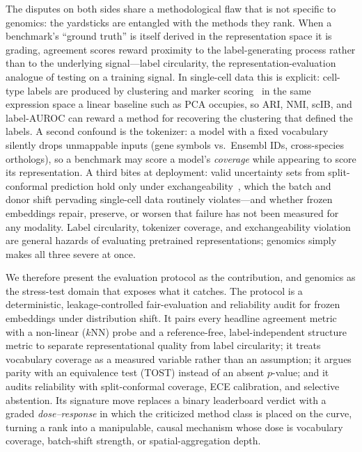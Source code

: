 \documentclass[11pt]{article}
\begin{document}
The disputes on both sides share a methodological flaw that is not specific to genomics: the yardsticks are entangled with the methods they rank. When a benchmark's ``ground truth'' is itself derived in the representation space it is grading, agreement scores reward proximity to the label-generating process rather than to the underlying signal---label circularity, the representation-evaluation analogue of testing on a training signal. In single-cell data this is explicit: cell-type labels are produced by clustering and marker scoring~\cite{wolf2018scanpy} in the same expression space a linear baseline such as PCA occupies, so ARI, NMI, scIB, and label-AUROC can reward a method for recovering the clustering that defined the labels. A second confound is the tokenizer: a model with a fixed vocabulary silently drops unmappable inputs (gene symbols vs.\ Ensembl IDs, cross-species orthologs), so a benchmark may score a model's \emph{coverage} while appearing to score its representation. A third bites at deployment: valid uncertainty sets from split-conformal prediction hold only under exchangeability~\cite{barber2023}, which the batch and donor shift pervading single-cell data routinely violates---and whether frozen embeddings repair, preserve, or worsen that failure has not been measured for any modality. Label circularity, tokenizer coverage, and exchangeability violation are general hazards of evaluating pretrained representations; genomics simply makes all three severe at once.

We therefore present the evaluation protocol as the contribution, and genomics as the stress-test domain that exposes what it catches. The protocol is a deterministic, leakage-controlled fair-evaluation and reliability audit for frozen embeddings under distribution shift. It pairs every headline agreement metric with a non-linear ($k$NN) probe and a reference-free, label-independent structure metric to separate representational quality from label circularity; it treats vocabulary coverage as a measured variable rather than an assumption; it argues parity with an equivalence test (TOST) instead of an absent $p$-value; and it audits reliability with split-conformal coverage, ECE calibration, and selective abstention. Its signature move replaces a binary leaderboard verdict with a graded \emph{dose--response} in which the criticized method class is placed on the curve, turning a rank into a manipulable, causal mechanism whose dose is vocabulary coverage, batch-shift strength, or spatial-aggregation depth.
\end{document}
